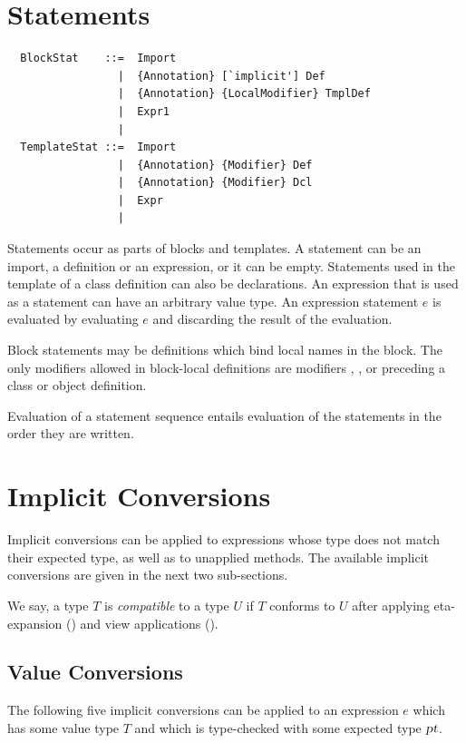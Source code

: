\section{Statements}
\label{sec:statements}

\syntax\begin{lstlisting}
  BlockStat    ::=  Import
                 |  {Annotation} [`implicit'] Def
                 |  {Annotation} {LocalModifier} TmplDef
                 |  Expr1
                 | 
  TemplateStat ::=  Import
                 |  {Annotation} {Modifier} Def
                 |  {Annotation} {Modifier} Dcl
                 |  Expr
                 | 
\end{lstlisting}

Statements occur as parts of blocks and templates.  A statement can be
an import, a definition or an expression, or it can be empty.
Statements used in the template of a class definition can also be
declarations.  An expression that is used as a statement can have an
arbitrary value type. An expression statement $e$ is evaluated by
evaluating $e$ and discarding the result of the evaluation. 

Block statements may be definitions which bind local names in the
block. The only modifiers allowed in block-local definitions are modifiers
, , or  preceding a class or
object definition.

Evaluation of a statement sequence entails evaluation of the
statements in the order they are written.

\section{Implicit Conversions}
\label{sec:impl-conv}

Implicit conversions can be applied to expressions whose type does not
match their expected type, as well as to unapplied methods. The
available implicit conversions are given in the next two sub-sections.

We say, a type $T$ is {\em compatible} to a type $U$ if $T$ conforms
to $U$ after applying eta-expansion () and view applications
().

\subsection{Value Conversions}

The following five implicit conversions can be applied to an
expression $e$ which has some value type $T$ and which is type-checked with
some expected type $\mbox{\sl pt}$.

